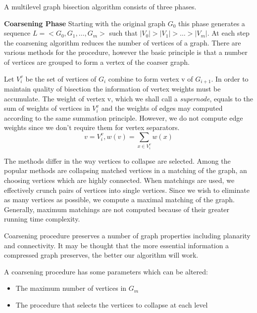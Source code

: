 \documentclass[a4paper,12pt]{article}
\begin{document}
A multilevel graph bisection algorithm consists of three phases.\cite{kumar}
\begin{description}
\item \textbf{Coarsening Phase} Starting with the original graph $G_0$
this phase generates a sequence $L=<G_0,G_1,\dots,G_m>$ such that
$|V_0| > |V_1| > \dots >|V_m|$. At each step the coarsening algorithm
reduces the number of vertices of a graph. There are various methods
for the procedure, however  the basic principle is that a number of
vertices are grouped to form a vertex of the coarser graph.

Let $V_i^v$ be the set of vertices of $G_i$ combine to form vertex v
of $G_{i+1}$. In order to maintain quality of bisection the
information of vertex weights must be accumulate. The weight of vertex
v, which we shall call a \textsl{supernode}, equals to the sum of
weights of vertices in $V_i^v$ and the weights of edges may computed
according to the same summation principle. However, we do not compute
edge weights since we don't require them for vertex separators.
\begin{equation}
	v=V_i^v, w(v) = \sum_{x \in V_i^v}{w(x)}
\end{equation}

The methods differ in the way vertices to collapse are selected. Among
the popular methods are collapsing matched vertices in a matching of
the graph, an choosing vertices which are highly connected. When
matchings are used, we effectively crunch pairs of vertices into
single vertices. Since we wish to eliminate as many vertices as
possible, we compute a maximal matching of the graph. Generally,
maximum matchings are not computed because of their greater running
time complexity.

Coarsening procedure preserves a number of graph properties including
planarity and connectivity. It may be thought that the more essential
information a compressed graph preserves, the better our algorithm
will work.

A coarsening procedure has some parameters which can be altered:
\begin{itemize}
\item The maximum number of vertices in $G_m$
\item The procedure that selects the vertices to collapse at each
level
\end{itemize}


\end{description}
\end{document}
